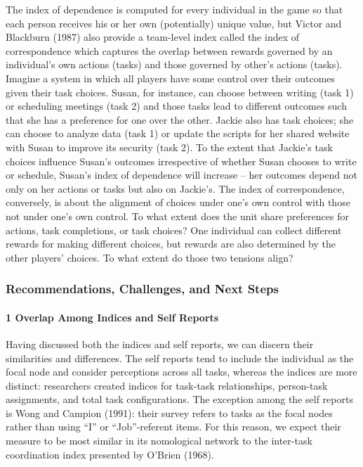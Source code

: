 \documentclass[english,,man]{apa6}
\let\oldparagraph\paragraph
\renewcommand{\paragraph}[1]{\oldparagraph{#1}\mbox{}}
\theoremstyle{definition}
\theoremstyle{definition}
\theoremstyle{definition}
\theoremstyle{remark}
\begin{document}
The index of dependence is computed for every individual in the game so
that each person receives his or her own (potentially) unique value, but
Victor and Blackburn (1987) also provide a team-level index called the
index of correspondence which captures the overlap between rewards
governed by an individual's own actions (tasks) and those governed by
other's actions (tasks). Imagine a system in which all players have some
control over their outcomes given their task choices. Susan, for
instance, can choose between writing (task 1) or scheduling meetings
(task 2) and those tasks lead to different outcomes such that she has a
preference for one over the other. Jackie also has task choices; she can
choose to analyze data (task 1) or update the scripts for her shared
website with Susan to improve its security (task 2). To the extent that
Jackie's task choices influence Susan's outcomes irrespective of whether
Susan chooses to write or schedule, Susan's index of dependence will
increase -- her outcomes depend not only on her actions or tasks but
also on Jackie's. The index of correspondence, conversely, is about the
alignment of choices under one's own control with those not under one's
own control. To what extent does the unit share preferences for actions,
task completions, or task choices? One individual can collect different
rewards for making different choices, but rewards are also determined by
the other players' choices. To what extent do those two tensions align?

\hypertarget{recommendations-challenges-and-next-steps}{%
\subsubsection{Recommendations, Challenges, and Next
Steps}\label{recommendations-challenges-and-next-steps}}

\hypertarget{overlap-among-indices-and-self-reports}{%
\paragraph{1 Overlap Among Indices and Self
Reports}\label{overlap-among-indices-and-self-reports}}

Having discussed both the indices and self reports, we can discern their
similarities and differences. The self reports tend to include the
individual as the focal node and consider perceptions across all tasks,
whereas the indices are more distinct: researchers created indices for
task-task relationships, person-task assignments, and total task
configurations. The exception among the self reports is Wong and Campion
(1991): their survey refers to tasks as the focal nodes rather than
using \enquote{I} or \enquote{Job}-referent items. For this reason, we
expect their measure to be most similar in its nomological network to
the inter-task coordination index presented by O'Brien (1968).
\end{document}
